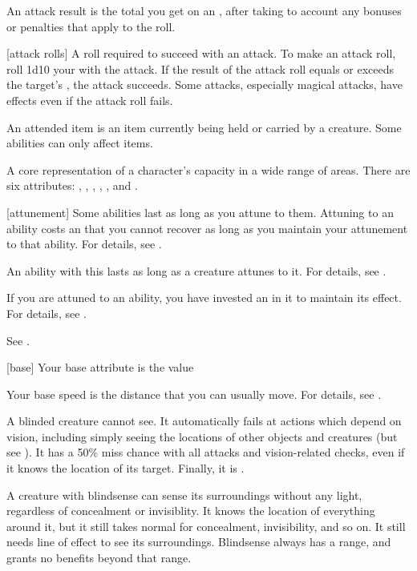 An attack result is the total you get on an , after taking to account any bonuses or penalties that apply to the roll.

[attack rolls] A roll required to succeed with an attack.
To make an attack roll, roll 1d10 \add your  with the attack.
If the result of the attack roll equals or exceeds the target's , the attack succeeds.
Some attacks, especially magical attacks, have effects even if the attack roll fails.

 An attended item is an item currently being held or carried by a creature.
Some abilities can only affect  items.

 A core representation of a character's capacity in a wide range of areas. There are six attributes: , , , , , and .

[attunement] Some abilities last as long as you attune to them.
Attuning to an ability costs an  that you cannot recover as long as you maintain your attunement to that ability.
For details, see .

 An ability with this  lasts as long as a creature attunes to it.
For details, see .

 If you are attuned to an ability, you have invested an  in it to maintain its effect.
For details, see .

 See .

[base] Your base attribute is the value 

 Your base speed is the distance that you can usually move.
For details, see .

 A blinded creature cannot see. It automatically fails at actions which depend on vision, including simply seeing the locations of other objects and creatures (but see ). It has a 50\% miss chance with all attacks and vision-related checks, even if it knows the location of its target. Finally, it is .

 A creature with blindsense can sense its surroundings without any light, regardless of concealment or invisiblity.
It knows the location of everything around it, but it still takes normal  for concealment, invisibility, and so on.
It still needs line of effect to see its surroundings.
Blindsense always has a range, and grants no benefits beyond that range.

